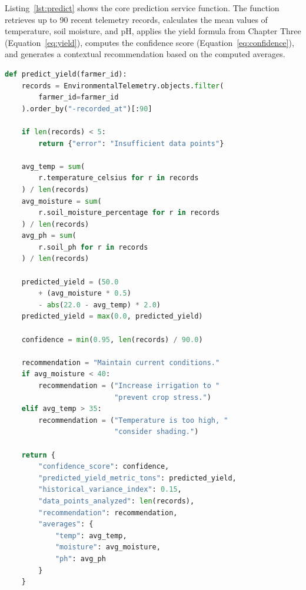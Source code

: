 Listing~\ref{lst:predict} shows the core prediction service function. The function retrieves up to 90 recent telemetry records, calculates the mean values of temperature, soil moisture, and pH, applies the yield formula from Chapter Three (Equation~\ref{eq:yield}), computes the confidence score (Equation~\ref{eq:confidence}), and generates a contextual recommendation based on the computed averages.

\noindent\begin{minipage}{\textwidth}
\begin{lstlisting}[language=Python, caption={Crop Yield Prediction Service}, label={lst:predict}]
def predict_yield(farmer_id):
    records = EnvironmentalTelemetry.objects.filter(
        farmer_id=farmer_id
    ).order_by("-recorded_at")[:90]

    if len(records) < 5:
        return {"error": "Insufficient data points"}

    avg_temp = sum(
        r.temperature_celsius for r in records
    ) / len(records)
    avg_moisture = sum(
        r.soil_moisture_percentage for r in records
    ) / len(records)
    avg_ph = sum(
        r.soil_ph for r in records
    ) / len(records)

    predicted_yield = (50.0
        + (avg_moisture * 0.5)
        - abs(22.0 - avg_temp) * 2.0)
    predicted_yield = max(0.0, predicted_yield)

    confidence = min(0.95, len(records) / 90.0)

    recommendation = "Maintain current conditions."
    if avg_moisture < 40:
        recommendation = ("Increase irrigation to "
                          "prevent crop stress.")
    elif avg_temp > 35:
        recommendation = ("Temperature is too high, "
                          "consider shading.")

    return {
        "confidence_score": confidence,
        "predicted_yield_metric_tons": predicted_yield,
        "historical_variance_index": 0.15,
        "data_points_analyzed": len(records),
        "recommendation": recommendation,
        "averages": {
            "temp": avg_temp,
            "moisture": avg_moisture,
            "ph": avg_ph
        }
    }
\end{lstlisting}
\end{minipage}



